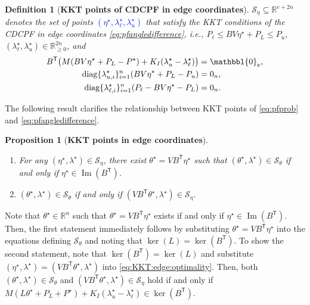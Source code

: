\documentclass[twocolumn,twoside,journal]{IEEEtran}
\DeclareMathOperator{\diag}{diag}
\DeclareMathOperator{\Ima}{Im}
\newtheorem{proposition}{Proposition}
\newtheorem{definition}{Definition}
\begin{document}
\begin{definition}[\textbf{KKT points of CDCPF in edge coordinates}]\label{def:seta}
$\mathcal{S}_{\eta} \subseteq \mathbb{R}^{e + 2n}$ denotes the set of points \textcolor{blue}{$(\eta^\star,\lambda^\star_\ell,\lambda^\star_u)$} that satisfy the KKT conditions of the CDCPF in edge coordinates \eqref{eq:pfangledifference}, i.e., $P_\ell \leq BV \eta^\star + P_L \leq P_u$,  $(\lambda^\star_\ell,\lambda^\star_u) \in \mathbb{R}^{2n}_{\geq 0}$, and 
\begin{subequations}\label{eq:KKT:edge} 
\begin{align} 
    B^\mathsf{T}\big(M (BV \eta^\star + P_L - P^\star) + K_I (\lambda^\star_u-\lambda^\star_\ell)\big) &= \mathbbl{0}_{e},\label{eq:KKT:edge:optimality}\\
    \diag\{\lambda^\star_{u,i}\}_{i=1}^n  (BV \eta^\star + P_L - P_u)&=0_n,\\
    \diag\{\lambda^\star_{\ell,i}\}_{i=1}^n  (P_\ell - BV \eta^\star - P_L)&=0_n.
\end{align}
\end{subequations}
\end{definition}
%
The following result clarifies the relationship between KKT points of \eqref{eq:pfprob} and \eqref{eq:pfangledifference}.
\begin{proposition}[\textbf{KKT points in edge coordinates}]\label{prop:equiv}\phantom{a}
\begin{enumerate}[label=(\roman*)]
    \item For any $(\eta^\star, \lambda^\star) \in \mathcal{S}_{\eta}$, there exist $\theta^\star=VB^\mathsf{T} \eta^\star$ such that $(\theta^\star, \lambda^\star) \in \mathcal{S}_\theta$ if and only if $\eta^\star \in \Ima(B^\mathsf{T})$.
        \item $(\theta^\star, \lambda^\star) \in \mathcal{S}_\theta$ if and only if $(VB^\mathsf{T} \theta^\star, \lambda^\star) \in \mathcal{S}_{\eta}$.
\end{enumerate}
\end{proposition}
\begin{IEEEproof}
Note that $\theta^\star \in \mathbb{R}^n$ such that $\theta^\star = V B^\mathsf{T}\eta^\star$ exists if and only if $\eta^\star \in \Ima(B^\mathsf{T})$. Then, the first statement immediately follows by substituting $\theta^\star = V B^\mathsf{T}\eta^\star$ into the equations defining $\mathcal{S}_{\theta}$ and noting that $\ker(L)=\ker(B^\mathsf{T})$. To show the second statement, note that $\ker(B^\mathsf{T}) = \ker(L)$ and substitute $(\eta^\star, \lambda^\star) = (VB^\mathsf{T}\theta^\star, \lambda^\star)$ into \eqref{eq:KKT:edge:optimality}. Then, both $(\theta^\star, \lambda^\star) \in \mathcal{S}_\theta$ and $(VB^\mathsf{T} \theta^\star, \lambda^\star) \in \mathcal{S}_{\eta}$ hold if and only if $M(L \theta^\star + P_L +P^\star)+ K_I (\lambda^\star_u-\lambda^\star_\ell) \in \ker(B^\mathsf{T})$.
\end{IEEEproof}
\end{document}
